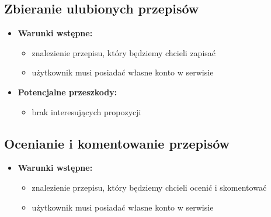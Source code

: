 \documentclass{article}
\begin{document}
\subsection{Zbieranie ulubionych przepisów}
  \begin{itemize}
    \item \textbf{Warunki wstępne:}
      \begin{itemize}
        \item znalezienie przepisu, który będziemy chcieli zapisać
        \item użytkownik musi posiadać własne konto w serwisie
      \end{itemize}
    \item \textbf{Potencjalne przeszkody:}
      \begin{itemize}
        \item brak interesujących propozycji
      \end{itemize}
  \end{itemize}
\subsection{Ocenianie i komentowanie przepisów}
  \begin{itemize}
    \item \textbf{Warunki wstępne:}
      \begin{itemize}
        \item znalezienie przepisu, który będziemy chcieli ocenić i skomentować
        \item użytkownik musi posiadać własne konto w serwisie
      \end{itemize}
  \end{itemize}
\end{document}
